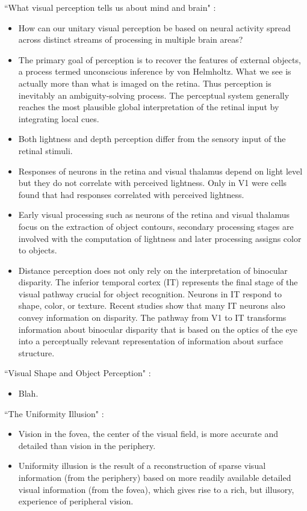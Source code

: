 \documentclass[11pt]{article}
\begin{document}
``What visual perception tells us about mind and brain" \cite{Shimojo12340}:
\begin{itemize}
	\item How can our unitary visual perception be based on neural activity spread across distinct streams of processing in multiple brain areas?
	\item The primary goal of perception is to recover the features of external objects, a process termed unconscious inference by von Helmholtz. What we see is actually more than what is imaged on the retina. Thus perception is inevitably an ambiguity-solving process. The perceptual system generally reaches the most plausible global interpretation of the retinal input by integrating local cues.
	\item Both lightness and depth perception differ from the sensory input of the retinal stimuli.
	\item Responses of neurons in the retina and visual thalamus depend on light level but they do not correlate with perceived lightness. Only in V1 were cells found that had responses correlated with perceived lightness.
	\item Early visual processing such as neurons of the retina and visual thalamus focus on the extraction of object contours, secondary processing stages are involved with the computation of lightness and later processing assigns color to objects.
	\item Distance perception does not only rely on the interpretation of binocular disparity. The inferior temporal cortex (IT) represents the final stage of the visual pathway crucial for object recognition. Neurons in IT respond to shape, color, or texture. Recent studies show that many IT neurons also convey information on disparity. The pathway from V1 to IT transforms information about binocular disparity that is based on the optics of the eye into a perceptually relevant representation of information about surface structure.
\end{itemize}

``Visual Shape and Object Perception" \cite{VisualShapeandObjectPerception}:
\begin{itemize}
	\item Blah.
\end{itemize}

``The Uniformity Illusion" \cite{uniformity}:
\begin{itemize}
	\item Vision in the fovea, the center of the visual field, is more accurate and detailed than vision in the periphery.
	\item Uniformity illusion is the result of a reconstruction of sparse visual information (from the periphery) based on more readily available detailed visual information (from the fovea), which gives rise to a rich, but illusory, experience of peripheral vision.
\end{itemize}
\end{document}
